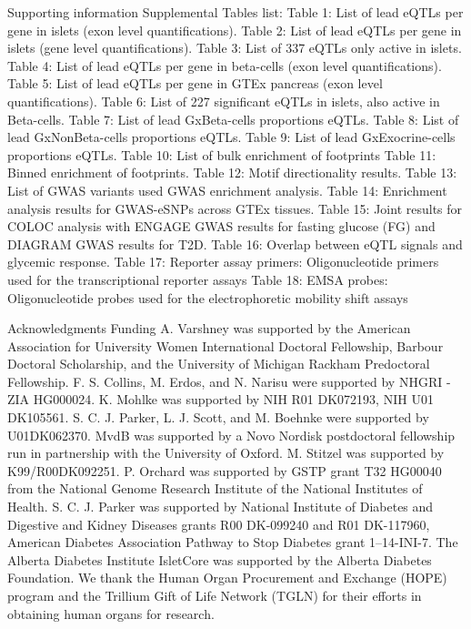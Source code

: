 Supporting information
Supplemental Tables list:
Table 1: List of lead eQTLs per gene in islets (exon level quantifications).
Table 2: List of lead eQTLs per gene in islets (gene level quantifications).
Table 3: List of 337 eQTLs only active in islets. 
Table 4: List of lead eQTLs per gene in beta-cells (exon level quantifications).
Table 5: List of lead eQTLs per gene in GTEx pancreas (exon level quantifications).
Table 6: List of 227 significant eQTLs in islets, also active in Beta-cells. 
Table 7: List of lead GxBeta-cells proportions eQTLs.
Table 8: List of lead GxNonBeta-cells proportions eQTLs.
Table 9: List of lead GxExocrine-cells proportions eQTLs.
Table 10: List of bulk enrichment of footprints 
Table 11: Binned enrichment of footprints. 
Table 12: Motif directionality results. 
Table 13: List of GWAS variants used GWAS enrichment analysis.
Table 14: Enrichment analysis results for GWAS-eSNPs across GTEx tissues. 
Table 15: Joint results for COLOC analysis with ENGAGE GWAS results for fasting glucose (FG) and DIAGRAM GWAS results for T2D.
Table  16: Overlap between eQTL signals and glycemic response. 
Table 17: Reporter assay primers: Oligonucleotide primers used for the transcriptional reporter assays
Table 18: EMSA probes: Oligonucleotide probes used for the electrophoretic mobility shift assays





Acknowledgments 
Funding 
A. Varshney was supported by the American Association for University Women International Doctoral Fellowship, Barbour Doctoral Scholarship, and the University of Michigan Rackham Predoctoral Fellowship.
F. S. Collins, M. Erdos, and N. Narisu were supported by NHGRI - ZIA HG000024. 
K. Mohlke was supported by NIH R01 DK072193, NIH U01 DK105561.
S. C. J. Parker, L. J. Scott, and M. Boehnke were supported  by U01DK062370.
MvdB was supported by a Novo Nordisk postdoctoral fellowship run in partnership with the University of Oxford. 
M. Stitzel was supported by K99/R00DK092251.
P. Orchard was supported by GSTP grant T32 HG00040 from the National Genome Research Institute of the National Institutes of Health.
S. C. J. Parker was supported by National Institute of Diabetes and Digestive and Kidney Diseases grants R00 DK-099240 and R01 DK-117960, American Diabetes Association Pathway to Stop Diabetes grant 1–14-INI-7. 
The Alberta Diabetes Institute IsletCore was supported by the Alberta Diabetes Foundation. We thank the Human Organ Procurement and Exchange (HOPE) program and the Trillium Gift of Life Network (TGLN) for their efforts in obtaining human organs for research.
